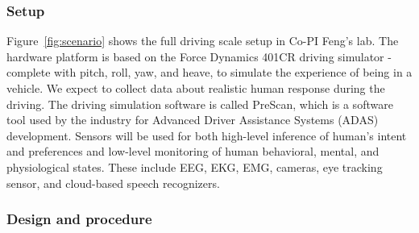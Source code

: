 \subsubsection{Setup}
Figure~\ref{fig:scenario} shows the full driving scale setup in Co-PI Feng's lab. 
The hardware platform is based on the Force Dynamics 401CR driving simulator - complete with pitch, roll, yaw, and heave, to simulate the experience of being in a vehicle. We expect to collect data about realistic human response during the driving. The driving simulation software is called PreScan, which is a software tool used by the industry for Advanced Driver Assistance Systems (ADAS) development. 
Sensors will be used for both high-level inference of human's intent and preferences and low-level monitoring of human behavioral, mental, and physiological states. These include EEG, EKG, EMG, cameras, eye tracking sensor, and cloud-based speech recognizers.
\vspace{-5pt}
\subsubsection{Design and procedure}

